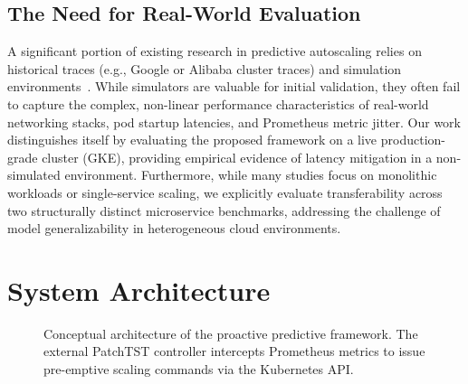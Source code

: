 \documentclass[conference]{IEEEtran}
\begin{document}
\subsection{The Need for Real-World Evaluation}
A significant portion of existing research in predictive autoscaling relies on historical traces (e.g., Google or Alibaba cluster traces) and simulation environments~\cite{rzadca2020autopilot, yan2021hansel}. While simulators are valuable for initial validation, they often fail to capture the complex, non-linear performance characteristics of real-world networking stacks, pod startup latencies, and Prometheus metric jitter. Our work distinguishes itself by evaluating the proposed framework on a live production-grade cluster (GKE), providing empirical evidence of latency mitigation in a non-simulated environment. Furthermore, while many studies focus on monolithic workloads or single-service scaling, we explicitly evaluate transferability across two structurally distinct microservice benchmarks, addressing the challenge of model generalizability in heterogeneous cloud environments.

\section{System Architecture}\label{sec:architecture}

\begin{figure}[htbp]
\centering
{}
\caption{Conceptual architecture of the proactive predictive framework. The external PatchTST controller intercepts Prometheus metrics to issue pre-emptive scaling commands via the Kubernetes API.}
\label{fig:arch}
\end{figure}
\end{document}
